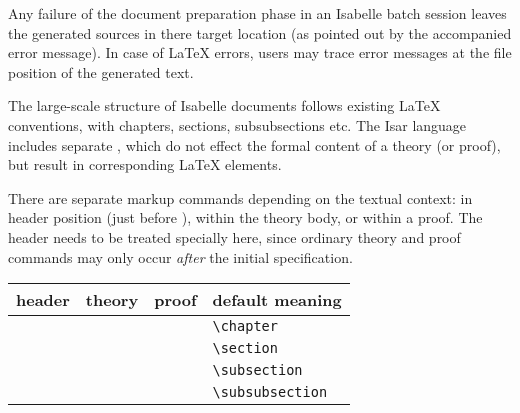 \begin{isabellebody}
\begin{isamarkuptext}
  \medskip Any failure of the document preparation phase in an
  Isabelle batch session leaves the generated sources in there target
  location (as pointed out by the accompanied error message).  In case
  of {\LaTeX} errors, users may trace error messages at the file
  position of the generated text.%
\end{isamarkuptext}%
\isamarkuptrue%
%
\isamarkuptrue%
%
\begin{isamarkuptext}%
The large-scale structure of Isabelle documents follows existing
  {\LaTeX} conventions, with chapters, sections, subsubsections etc.
  The Isar language includes separate , which
  do not effect the formal content of a theory (or proof), but result
  in corresponding {\LaTeX} elements.

  There are separate markup commands depending on the textual context:
  in header position (just before ), within the
  theory body, or within a proof.  The header needs to be treated
  specially here, since ordinary theory and proof commands may only
  occur \emph{after} the initial  specification.

  \medskip

  \begin{tabular}{llll}
  header & theory & proof & default meaning \\\hline
    & \commdx{chapter} & & \verb,\chapter, \\
  \commdx{header} & \commdx{section} & \commdx{sect} & \verb,\section, \\
    & \commdx{subsection} & \commdx{subsect} & \verb,\subsection, \\
    & \commdx{subsubsection} & \commdx{subsubsect} & \verb,\subsubsection, \\
  \end{tabular}


\end{isamarkuptext}
\end{isabellebody}
